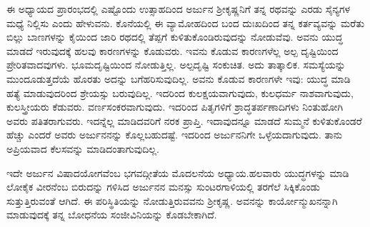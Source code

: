 ಈ ಅಧ್ಯಾಯದ ಪ್ರಾರಂಭದಲ್ಲಿ ಎಷ್ಟೊಂದು ಉತ್ಸಾಹದಿಂದ ಅರ್ಜುನ ಶ‍್ರೀಕೃಷ್ಣನಿಗೆ ತನ್ನ ರಥವನ್ನು ಎರಡು ಸೈನ್ಯಗಳ ಮಧ್ಯೆ ನಿಲ್ಲಿಸು ಎಂದು ಹೇಳುವನು. ಕೊನೆಯಲ್ಲಿ ಈ ವ್ಯಾಮೋಹದಿಂದ ಬಂದ ದುಃಖದಿಂದ ತನ್ನ ಕರ್ತವ್ಯವನ್ನು ಮರೆತು ಬಿಲ್ಲು ಬಾಣಗಳನ್ನು ಕೈಯಿಂದ ಜಾರಿ ರಥದಲ್ಲಿ ತೆಪ್ಪಗೆ ಕುಳಿತುಕೊಂಡಿರುವುದನ್ನು ನೋಡುವೆವು. ಅವನು ಯುದ್ಧ ಮಾಡದೆ ಇರುವುದಕ್ಕೆ ಹಲವು ಕಾರಣಗಳನ್ನು ಕೊಡುವರು. ಇವನು ಕೊಡುವ ಕಾರಣಗಳೆಲ್ಲ ಅಲ್ಪ ದೃಷ್ಟಿಯಿಂದ ಪ್ರೇರಿತವಾದವುಗಳು. ಭೂಮದೃಷ್ಟಿಯಿಂದ ನೋಡುತ್ತಿಲ್ಲ. ಅಲ್ಪದೃಷ್ಟಿ ಸಂಕುಚಿತ. ಅದು ತಾತ್ಕಾಲಿಕ. ಸಮಸ್ಯೆಯನ್ನು ಮುಂದೂಡುತ್ತದೆಯೆ ಹೊರತು ಅದನ್ನು ಬಗೆಹರಿಸುವುದಿಲ್ಲ. ಅವನು ಕೊಡುವ ಕಾರಣಗಳೇ ಇವು: ಯುದ್ಧ ಮಾಡಿ ಹತ್ಯೆ ಮಾಡುವುದರಿಂದ ಶ್ರೇಯಸ್ಸು ಬರುವುದಿಲ್ಲ. ಇದರಿಂದ ಕುಲಕ್ಷಯವಾಗುವುದು, ಕುಲಧರ್ಮ ನಾಶವಾಗುವುದು, ಕುಲಸ್ತ್ರೀಯರು ಕೆಡುವರು. ವರ್ಣಸಂಕರವಾಗುವುದು. ಇದರಿಂದ ಪಿತೃಗಳಿಗೆ ಶ್ರಾದ್ಧತರ್ಪಣಾದಿಗಳು ನಿಂತುಹೋಗಿ ಅವರು ಪತಿತರಾಗುವರು. ಇದನ್ನೆಲ್ಲ ಮಾಡಿದವರಿಗೆ ನರಕ ಪ್ರಾಪ್ತಿ. ಇದಾವುದನ್ನೂ ಮಾಡದೆ ಸುಮ್ಮನೆ ಕುಳಿತುಕೊಂಡರೆ ಹೆಚ್ಚು ಎಂದರೆ ಅವರು ಅರ್ಜುನನನ್ನು ಕೊಲ್ಲಬಹುದಷ್ಟೆ. ಇದರಿಂದ ಅರ್ಜುನನಿಗೇ ಒಳ್ಳೆಯದಾಗುವುದು. ತಾನು ಅಪ್ರಿಯವಾದ ಕೆಲಸವನ್ನು ಮಾಡಿದಂತಾಗುವುದಿಲ್ಲ.

ಇದೇ ಅರ್ಜುನ ವಿಷಾದಯೋಗವೆಂಬ ಭಗವದ್ಗೀತೆಯ ಮೊದಲನೆಯ ಅಧ್ಯಾಯ.\break ಹಲವಾರು ಯುದ್ಧಗಳನ್ನು ಮಾಡಿ ಲೋಕೈಕ ವೀರನೆಂಬ ಬಿರುದನ್ನು ಗಳಿಸಿದ ಅರ್ಜುನನ ಮನಸ್ಸು ಸುಂಟರಗಾಳಿಯಲ್ಲಿ ತರಗೆಲೆ ಸಿಕ್ಕಿಕೊಂಡು ಸುತ್ತುತ್ತಿರುವಂತೆ ಆಗಿದೆ. ಈ ಪರಿಸ್ಥಿತಿಯನ್ನು ನೋಡುತ್ತಿರುವವನು ಶ‍್ರೀಕೃಷ್ಣ. ಅವನನ್ನು ಕಾರ್ಯೋನ್ಮುಖನನ್ನಾಗಿ ಮಾಡುವುದಕ್ಕೆ ತನ್ನ ಬೋಧನೆಯ ಸಂಜೀವಿನಿಯನ್ನು ಕೊಡಬೇಕಾಗಿದೆ.

